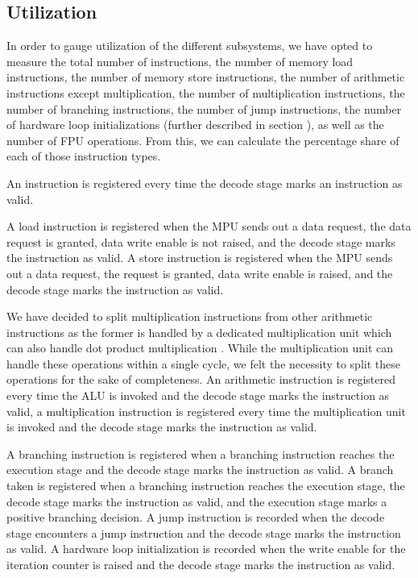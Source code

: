 \documentclass[../bachelor_paper.tex]{subfiles}
\begin{document}
\subsection{Utilization}
    \label{sub:arch/feat/ut}
In order to gauge utilization of the different subsystems, we have opted to measure the total number of instructions, the number of memory load instructions, the number of memory store instructions, the number of arithmetic instructions except multiplication, the number of multiplication instructions, the number of branching instructions, the number of jump instructions, the number of hardware loop initializations (further described in section ), as well as the number of \ac{FPU} operations. From this, we can calculate the percentage share of each of those instruction types. 

An instruction is registered every time the decode stage marks an instruction as valid.

A load instruction is registered when the \ac{MPU}  sends out a data request, the data request is granted, data write enable is not raised, and the decode stage marks the instruction as valid. A store instruction is registered when the \ac{MPU} sends out a data request, the request is granted, data write enable is raised, and the decode stage marks the instruction as valid.

We have decided to split multiplication instructions from other arithmetic instructions as the former is handled by a dedicated multiplication unit which can also handle dot product multiplication \cite{gautschiNearThresholdRISCVCore2017}. While the multiplication unit can handle these operations within a single cycle, we felt the necessity to split these operations for the sake of completeness. An arithmetic instruction is registered every time the \ac{ALU} is invoked and the decode stage marks the instruction as valid, a multiplication instruction is registered every time the multiplication unit is invoked and the decode stage marks the instruction as valid.

A branching instruction is registered when a branching instruction reaches the execution stage and the decode stage marks the instruction as valid. A branch taken is registered when a branching instruction reaches the execution stage, the decode stage marks the instruction as valid, and the execution stage marks a positive branching decision. A jump instruction is recorded when the decode stage encounters a jump instruction and the decode stage marks the instruction as valid. A hardware loop initialization is recorded when the write enable for the iteration counter is raised and the decode stage marks the instruction as valid. 
\end{document}
